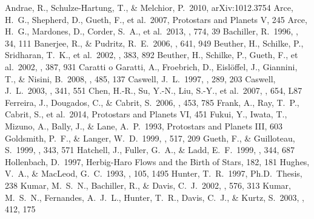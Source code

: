 \documentclass[twocolumn]{aastex61}
\begin{document}
\begin{thebibliography}{}
 Andrae, R., Schulze-Hartung, T., \& Melchior, P.\ 2010, arXiv:1012.3754
 Arce, H.~G., Shepherd, D., Gueth, F., et al.\ 2007, Protostars and Planets V, 245 
 Arce, H.~G., Mardones, D., Corder, S.~A., et al.\ 2013, \apj, 774, 39
 Bachiller, R.\ 1996, \araa, 34, 111 
 Banerjee, R., \& Pudritz, R.~E.\ 2006, \apj, 641, 949 
 Beuther, H., Schilke, P., Sridharan, T.~K., et al.\ 2002, \aap, 383, 892
 Beuther, H., Schilke, P., Gueth, F., et al.\ 2002, \aap, 387, 931 
 Caratti o Garatti, A., Froebrich, D., Eisl{\"o}ffel, J., Giannini, T., \& Nisini, B.\ 2008, \aap, 485, 137
 Caswell, J.~L.\ 1997, \mnras, 289, 203 
 Caswell, J.~L.\ 2003, \mnras, 341, 551 
 Chen, H.-R., Su, Y.-N., Liu, S.-Y., et al.\ 2007, \apjl, 654, L87 
 Ferreira, J., Dougados, C., \& Cabrit, S.\ 2006, \aap, 453, 785 
 Frank, A., Ray, T.~P., Cabrit, S., et al.\ 2014, Protostars and Planets VI, 451
 Fukui, Y., Iwata, T., Mizuno, A., Bally, J., \& Lane, A.~P.\ 1993, Protostars and Planets III, 603
 Goldsmith, P.~F., \& Langer, W.~D.\ 1999, \apj, 517, 209
 Gueth, F., \& Guilloteau, S.\ 1999, \aap, 343, 571 
 Hatchell, J., Fuller, G.~A., \& Ladd, E.~F.\ 1999, \aap, 344, 687 
 Hollenbach, D.\ 1997, Herbig-Haro Flows and the Birth of Stars, 182, 181 
 Hughes, V.~A., \& MacLeod, G.~C.\ 1993, \aj, 105, 1495
 Hunter, T.~R.\ 1997, Ph.D.~Thesis, 238 
 Kumar, M.~S.~N., Bachiller, R., \& Davis, C.~J.\ 2002, \apj, 576, 313 
 Kumar, M.~S.~N., Fernandes, A.~J.~L., Hunter, T.~R., Davis, C.~J., \& Kurtz, S.\ 2003, \aap, 412, 175 

\end{thebibliography}
\end{document}
